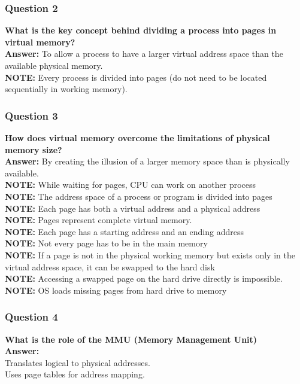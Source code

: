 \documentclass{article}
\begin{document}
\subsubsection*{Question 2}
\textbf{What is the key concept behind dividing a process into pages in virtual memory?} \\
\textbf{Answer:} To allow a process to have a larger virtual address space than the available physical memory. \\
\textbf{NOTE:} Every process is divided into pages (do not need to be located sequentially in working memory).

\subsubsection*{Question 3}
\textbf{How does virtual memory overcome the limitations of physical memory size?} \\
\textbf{Answer:} By creating the illusion of a larger memory space than is physically available. \\
\textbf{NOTE:} While waiting for pages, CPU can work on another process \\
\textbf{NOTE:} The address space of a process or program is divided into pages \\
\textbf{NOTE:} Each page has both a virtual address and a physical address \\
\textbf{NOTE:} Pages represent complete virtual memory. \\
\textbf{NOTE:} Each page has a starting address and an ending address \\
\textbf{NOTE:} Not every page has to be in the main memory \\
\textbf{NOTE:} If a page is not in the physical working memory but exists only in the virtual address space, it can be swapped to the hard disk \\
\textbf{NOTE:} Accessing a swapped page on the hard drive directly is impossible. \\
\textbf{NOTE:} OS loads missing pages from hard drive to memory

\subsubsection*{Question 4}
\textbf{What is the role of the MMU (Memory Management Unit)} \\
\textbf{Answer:} \\
Translates logical to physical addresses. \\
Uses page tables for address mapping.
\end{document}
